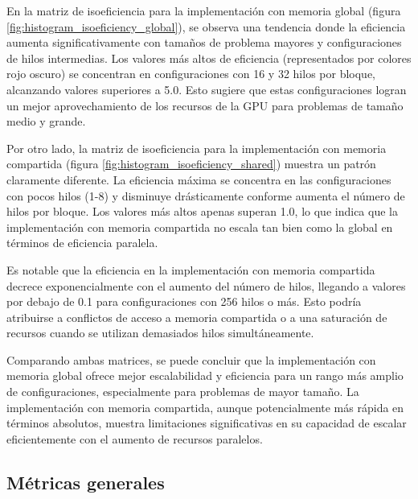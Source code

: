         En la matriz de isoeficiencia para la implementación con memoria global (figura \ref{fig:histogram_isoeficiency_global}), se observa una tendencia donde la eficiencia aumenta significativamente con tamaños de problema mayores y configuraciones de hilos intermedias. Los valores más altos de eficiencia (representados por colores rojo oscuro) se concentran en configuraciones con 16 y 32 hilos por bloque, alcanzando valores superiores a 5.0. Esto sugiere que estas configuraciones logran un mejor aprovechamiento de los recursos de la GPU para problemas de tamaño medio y grande.
        
        Por otro lado, la matriz de isoeficiencia para la implementación con memoria compartida (figura \ref{fig:histogram_isoeficiency_shared}) muestra un patrón claramente diferente. La eficiencia máxima se concentra en las configuraciones con pocos hilos (1-8) y disminuye drásticamente conforme aumenta el número de hilos por bloque. Los valores más altos apenas superan 1.0, lo que indica que la implementación con memoria compartida no escala tan bien como la global en términos de eficiencia paralela.
        
        Es notable que la eficiencia en la implementación con memoria compartida decrece exponencialmente con el aumento del número de hilos, llegando a valores por debajo de 0.1 para configuraciones con 256 hilos o más. Esto podría atribuirse a conflictos de acceso a memoria compartida o a una saturación de recursos cuando se utilizan demasiados hilos simultáneamente.

        Comparando ambas matrices, se puede concluir que la implementación con memoria global ofrece mejor escalabilidad y eficiencia para un rango más amplio de configuraciones, especialmente para problemas de mayor tamaño. La implementación con memoria compartida, aunque potencialmente más rápida en términos absolutos, muestra limitaciones significativas en su capacidad de escalar eficientemente con el aumento de recursos paralelos.
        
    \subsection{Métricas generales}

